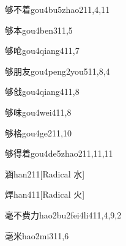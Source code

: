 \begin{verbete}{够不着}{gou4bu5zhao2}{11,4,11}
\end{verbete}

\begin{verbete}{够本}{gou4ben3}{11,5}
\end{verbete}

\begin{verbete}{够呛}{gou4qiang4}{11,7}
\end{verbete}

\begin{verbete}{够朋友}{gou4peng2you5}{11,8,4}
\end{verbete}

\begin{verbete}{够戗}{gou4qiang4}{11,8}
\end{verbete}

\begin{verbete}{够味}{gou4wei4}{11,8}
\end{verbete}

\begin{verbete}{够格}{gou4ge2}{11,10}
\end{verbete}

\begin{verbete}{够得着}{gou4de5zhao2}{11,11,11}
\end{verbete}

\begin{verbete}{涵}{han2}{11}[Radical 水]
\end{verbete}

\begin{verbete}{焊}{han4}{11}[Radical 火]
\end{verbete}

\begin{verbete}{毫不费力}{hao2bu2fei4li4}{11,4,9,2}
\end{verbete}

\begin{verbete}{毫米}{hao2mi3}{11,6}
\end{verbete}

